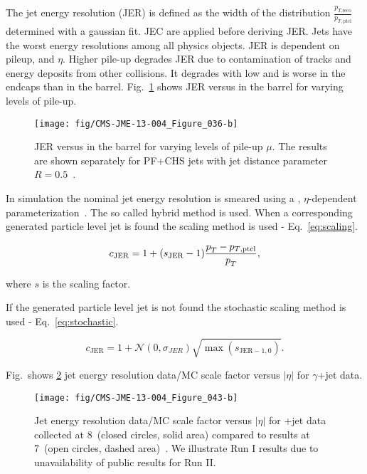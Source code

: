 \begin{description}
The jet energy resolution (JER) is defined as the width of the distribution $\frac{p_{T\text{,reco}}}{p_{T,\text{ptcl}}}$ determined with a gaussian fit. JEC are applied before deriving JER. Jets have the worst energy resolutions among all physics objects. JER is dependent on pileup, \pt and $\eta$. Higher pile-up degrades JER due to contamination of tracks and energy deposits from other collisions. It degrades with low \pt and is worse in the endcaps than in the barrel. Fig.~\ref{fig:JER} shows JER versus \pt in the barrel for varying levels of pile-up.

\begin{figure}[htp]
\centering
  \def\twidth{0.45}
  \centering
    \texttt{[image: fig/CMS-JME-13-004\_Figure\_036-b]}
\caption{JER versus \pt in the barrel for varying levels of pile-up $\mu$. The results are shown separately for PF+CHS jets with jet distance parameter $R=0.5$~\cite{Khachatryan:2016kdb}.}
\label{fig:JER}
\end{figure}

In simulation the nominal jet energy resolution is smeared using a \pt, $\eta$-dependent parameterization~\cite{twiki:JER}. The so called hybrid method is used. When a corresponding generated particle level jet is found the scaling method is used - Eq.~\ref{eq:scaling}.

\begin{equation}
c_{\text{JER}}=1 + (s_{\text{JER}}-1)\frac{p_{T}^{}-p_{T\text{,ptcl}}}{p_{T}^{}},
\label{eq:scaling}
\end{equation}

where $s$ is the scaling factor.

If the generated particle level jet is not found the stochastic scaling method is used - Eq.~\ref{eq:stochastic}.

\begin{equation}
c_{\text{JER}}=1+\mathcal{N}(0,\sigma_{JER})\sqrt{\max(s_{\text{JER}-1,0})}.
\label{eq:stochastic}
\end{equation}

Fig.~shows \ref{fig:CMS-JME-13-004_Figure_041} jet energy resolution data/MC scale factor versus $\left|\eta\right|$ for $\gamma$+jet data.

\begin{figure}[htp]
\centering
  \def\twidth{0.45}
  \centering
    \texttt{[image: fig/CMS-JME-13-004\_Figure\_043-b]}
  \caption{Jet energy resolution data/MC scale factor versus $\left|\eta\right|$ for \cPgg+jet data collected at 8~\TeV (closed circles, solid area) compared to results at 7~\TeV (open circles, dashed area)~\cite{Khachatryan:2016kdb}. We illustrate Run I results due to unavailability of public results for Run II.}
  \label{fig:CMS-JME-13-004_Figure_041}
\end{figure}


\end{description}

